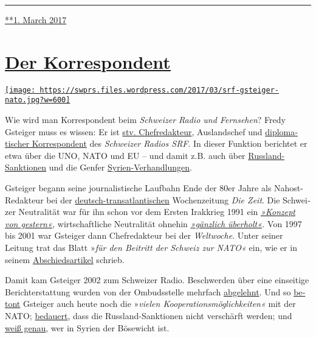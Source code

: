 \begin{center}\rule{0.5\linewidth}{\linethickness}\end{center}

\href{https://swprs.org/2017/03/01/propaganda-im-staatsauftrag/}{**1.
March 2017}

\hypertarget{der-korrespondent}{%
\section{\texorpdfstring{\href{https://swprs.org/2017/03/01/der-korrespondent/}{Der
Korrespondent}}{Der Korrespondent}}\label{der-korrespondent}}

\href{https://swprs.org/2017/03/01/der-korrespondent/}{\texttt{[image: https://swprs.files.wordpress.com/2017/03/srf-gsteiger-nato.jpg?w=600]}}

Wie wird man Kor­res­pon­dent beim \emph{Schwei­zer Radio und
Fern­sehen}? Fredy Gsteiger muss es wissen: Er ist
\href{http://www.persoenlich.com/medien/fredy-gsteiger-neu-in-der-radio-chefredaktion-232921}{stv.
Chef­redakteur}, Auslands­chef und
\href{http://www.srf.ch/radio-srf-1/radio-srf-1/fredy-gsteiger-unser-mann-in-der-uno}{diplo­ma­tischer
Korres­pon­dent} des \emph{Schwei­zer Radios SRF}. In dieser Funktion
be­richtet er etwa über die UNO, NATO und EU -- und damit z.B. auch über
\href{http://www.srf.ch/news/international/dieser-eu-rueckzieher-ist-peinlich}{Russ­land-Sanktionen}
und die Genfer
\href{http://www.srf.ch/news/international/assad-kommt-mit-giftgaseinsaetzen-vorlaeufig-davon}{Syrien-Ver­hand­lungen}.

Gsteiger begann seine journa­lis­tische Lauf­bahn Ende der 80er Jahre
als Nahost-Redakteur bei der
\href{https://swprs.org/netzwerk-medien-deutschland/}{deutsch-trans­atlan­tischen}
Wochen­zeitung \emph{Die Zeit}. Die Schwei­zer Neutra­lität war für ihn
schon vor dem Ersten Irak­krieg 1991 ein
\emph{\href{http://www.zeit.de/1990/44/ein-konzept-von-gestern}{»Konzept
von gestern«},} wirt­schaft­liche Neutralität ohnehin
\emph{\href{http://www.zeit.de/1990/44/ein-konzept-von-gestern}{»gänz­lich
über­holt«}.} Von 1997 bis 2001 war Gsteiger dann Chef­redakteur bei der
\emph{Welt­woche}. Unter seiner Leitung trat das Blatt »\emph{für den
Bei­tritt der Schweiz zur NATO«} ein, wie er in seinem
\href{https://web.archive.org/web/20040722094101/http://www.weltwoche.ch/artikel/?AssetID=400\&CategoryID=60}{Abschieds­artikel}
schrieb.

Damit kam Gsteiger 2002 zum Schweizer Radio. Be­schwer­den über eine
ein­sei­tige Be­richt­er­stattung wurden von der Ombuds­stelle mehr­fach
\href{https://www.srgd.ch/de/aktuelles/news/2016/09/28/sendung-info-3-auf-radio-srf-3-uber-waffenruhe-syrien-beanstandet/}{abge­lehnt}.
Und so
\href{http://www.swissinfo.ch/ger/kooperation_die-nato-umwirbt-die-schweiz/42225918}{be­tont}
Gsteiger auch heute noch die »\emph{vielen
Koope­ra­tions­möglich­keiten«} mit der NATO;
\href{http://www.srf.ch/news/international/dieser-eu-rueckzieher-ist-peinlich}{be­dauert},
dass die Russ­land-Sanktionen nicht ver­schärft werden; und
\href{http://www.srf.ch/news/international/assad-kommt-mit-giftgaseinsaetzen-vorlaeufig-davon}{weiß
genau}, wer in Syrien der Böse­wicht ist.

